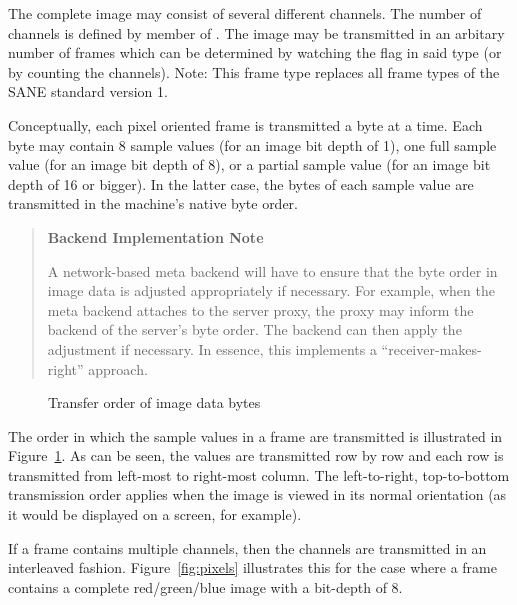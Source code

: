\documentclass[11pt,DVIps]{report}
\begin{document}
\begin{changebar}
  The complete image may consist of several different channels. The number of channels
  is defined by member  of .
  The image may be transmitted in an arbitary number of frames which can be
  determined by watching the  flag in said type (or by
  counting the channels).  Note: This frame type replaces all frame types of
  the SANE standard version 1.
\end{changebar}

Conceptually, each pixel oriented frame is transmitted a byte at a time.  Each
byte may contain 8 sample values (for an image bit depth of 1), one full
sample value (for an image bit depth of 8), or a partial sample value (for an
image bit depth of 16 or bigger).  In the latter case, the bytes of each
sample value are transmitted in the machine's native byte order.
\begin{quote}
  \begin{center}
    {\bf Backend Implementation Note}
  \end{center}
  A network-based meta backend will have to ensure that the byte order
  in image data is adjusted appropriately if necessary.  For example,
  when the meta backend attaches to the server proxy, the proxy may
  inform the backend of the server's byte order.  The backend can then
  apply the adjustment if necessary.  In essence, this implements a
  ``receiver-makes-right'' approach.
\end{quote}

\begin{figure}[htbp]
  \begin{center}
    \leavevmode
    \caption{Transfer order of image data bytes}
    \label{fig:xfer}
  \end{center}
\end{figure}

The order in which the sample values in a frame are transmitted is illustrated
in Figure~\ref{fig:xfer}.  As can be seen, the values are transmitted row by
row and each row is transmitted from left-most to right-most column.  The
left-to-right, top-to-bottom transmission order applies when the image is
viewed in its normal orientation (as it would be displayed on a screen, for
example).

If a frame contains multiple channels, then the channels are transmitted in an
interleaved fashion.  Figure~\ref{fig:pixels} illustrates this for the case
where a frame contains a complete red/green/blue image with a bit-depth of 8.
\end{document}
